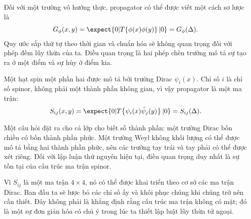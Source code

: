 Đối với một trường vô hướng thực, propagator có thể được viết một cách sơ lược là
\begin{equation}
G_\phi(x,y)=\expect{0|T\!\left\{\phi(x)\phi(y)\right\}|0}
=G_\phi(\Delta).
\end{equation}
Quy ước sắp thứ tự theo thời gian và chuẩn hóa sẽ không quan trọng đối với phép đếm lũy thừa của ta. Điều quan trọng là hai phép chèn trường mô tả sự tạo ra ở một điểm và sự hủy ở điểm kia.

\begin{classroomqa}
\end{classroomqa}

Một hạt spin một phần hai được mô tả bởi trường Dirac \(\psi_i(x)\). Chỉ số \(i\) là chỉ số spinor, không phải một thành phần không gian, vì vậy propagator là một ma trận:
\begin{equation}
S_{ij}(x,y)=\expect{0|T\!\left\{\psi_i(x)\bar\psi_j(y)\right\}|0}
=S_{ij}(\Delta).
\end{equation}

Một câu hỏi đặt ra cho cả lớp cho biết số thành phần: một trường Dirac bốn chiều có bốn thành phần phức. Một trường Weyl không khối lượng có thể được mô tả bằng hai thành phần phức, nên các trường tay trái và tay phải có thể được xét riêng. Đối với lập luận thứ nguyên hiện tại, điều quan trọng duy nhất là sự tồn tại của cấu trúc ma trận spinor.

Vì \(S_{ij}\) là một ma trận \(4\times4\), nó có thể được khai triển theo cơ sở các ma trận Dirac. Ban đầu ta sẽ lược bỏ các chỉ số ấy và khôi phục chúng khi chúng trở nên cần thiết. Đây không phải là khẳng định rằng cấu trúc ma trận không có mặt; đó là một sự đơn giản hóa có chủ ý trong lúc ta thiết lập luật lũy thừa tử ngoại.

\begin{classroomqa}
\end{classroomqa}

